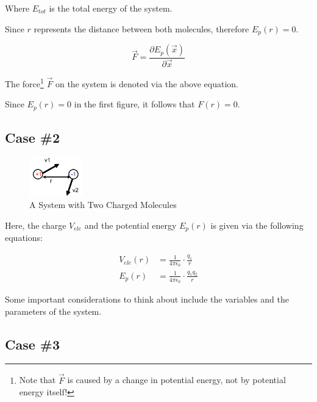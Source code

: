 \documentclass[
  letterpaper,
  DIV=11,
  numbers=noendperiod]{scrreprt}
\begin{document}
Where \(E_{tot}\) is the total energy of the system.

Since \(r\) represents the distance between both molecules, therefore
\(E_p(r) = 0\).

\begin{equation}
  \vec{F} = \frac{\partial E_p(\vec{x})}{\partial \vec{x}}
\end{equation}

The force\footnote{Note that \(\vec{F}\) is caused by a change in
  potential energy, not by potential energy itself!} \(\vec{F}\) on the
system is denoted via the above equation.

Since \(E_p(r) = 0\) in the first figure, it follows that \(F(r) = 0\).

\hypertarget{case-2}{%
\subsection{Case \#2}\label{case-2}}

\begin{figure}

{\centering \includegraphics[width=0.92in,height=\textheight]{./images/wk1/sys2.jpg}

}

\caption{A System with Two Charged Molecules}

\end{figure}

Here, the charge \(V_{ele}\) and the potential energy \(E_p(r)\) is
given via the following equations:

\begin{align}
  V_{ele}(r) &= \frac{1}{4\pi \epsilon_0} \cdot \frac{q_1}{r} \\ 
  E_p(r) &= \frac{1}{4\pi \epsilon_0} \cdot \frac{q_1q_2}{r}
\end{align}

Some important considerations to think about include the variables and
the parameters of the system.

\hypertarget{case-3}{%
\subsection{Case \#3}\label{case-3}}
\end{document}
